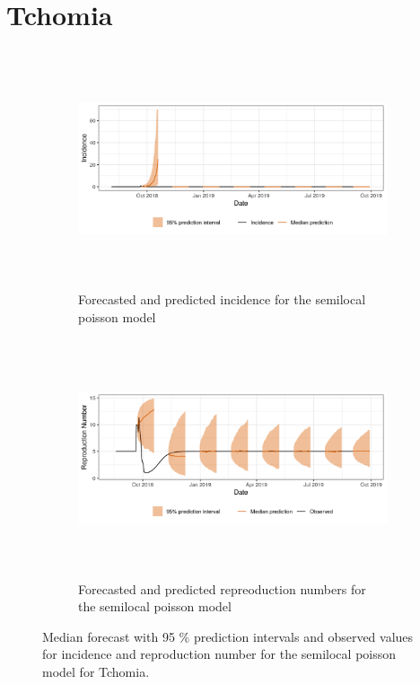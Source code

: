  \section{ Tchomia }\begin{figure}[H]\begin{subfigure}{\textwidth}  \centering  \includegraphics[width=0.9\linewidth, height=7cm]{../output/Tchomia_predictions.png}  \caption{Forecasted and predicted incidence for the semilocal poisson model}\end{subfigure}

\begin{subfigure}{\textwidth}  \centering  \includegraphics[width=0.9\linewidth, height=7cm]{../output/Tchomia_Rs.png}  \caption{Forecasted and predicted repreoduction numbers for the semilocal poisson model}\end{subfigure}  \caption{Median forecast with 95 \% prediction intervals and observed values for incidence and reproduction number for the semilocal poisson model for Tchomia.}\end{figure}

